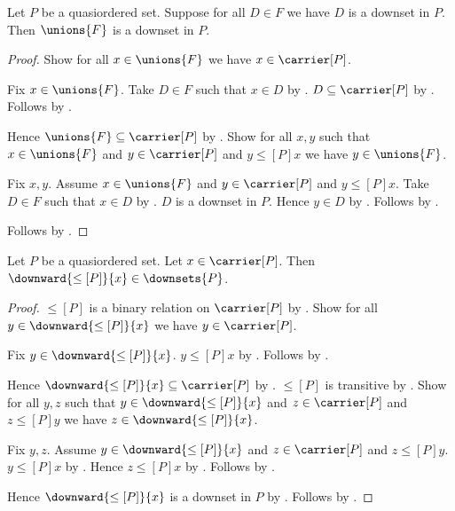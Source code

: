 \begin{proposition}\label{downset_unions}
    Let $P$ be a quasiordered set.
    Suppose for all $D\in F$ we have $D$ is a downset in $P$.
    Then $\unions{F}$ is a downset in $P$.
\end{proposition}
\begin{proof}
    Show for all $x\in\unions{F}$ we have $x\in\carrier[P]$.
    \begin{subproof}
        Fix $x\in\unions{F}$.
        Take $D\in F$ such that $x\in D$ by .
        $D\subseteq\carrier[P]$ by .
        Follows by .
    \end{subproof}
    Hence $\unions{F}\subseteq\carrier[P]$ by .
    Show for all $x,y$ such that $x\in\unions{F}$ and
        $y\in\carrier[P]$ and $y\mathrel{\leq[P]}x$ we have
        $y\in\unions{F}$.
    \begin{subproof}
        Fix $x,y$.
        Assume $x\in\unions{F}$ and $y\in\carrier[P]$ and
            $y\mathrel{\leq[P]}x$.
        Take $D\in F$ such that $x\in D$ by .
        $D$ is a downset in $P$.
        Hence $y\in D$ by .
        Follows by .
    \end{subproof}
    Follows by .
\end{proof}

\begin{theorem}\label{relation_downward_is_downset}
    Let $P$ be a quasiordered set.
    Let $x\in\carrier[P]$.
    Then $\downward{\leq[P]}{x}\in\downsets{P}$.
\end{theorem}
\begin{proof}
    $\leq[P]$ is a binary relation on $\carrier[P]$ by
        .
    Show for all $y\in\downward{\leq[P]}{x}$ we have
        $y\in\carrier[P]$.
    \begin{subproof}
        Fix $y\in\downward{\leq[P]}{x}$.
        $y\mathrel{\leq[P]}x$ by .
        Follows by .
    \end{subproof}
    Hence $\downward{\leq[P]}{x}\subseteq\carrier[P]$ by
        .
    $\leq[P]$ is transitive by .
    Show for all $y,z$ such that
        $y\in\downward{\leq[P]}{x}$ and $z\in\carrier[P]$ and
        $z\mathrel{\leq[P]}y$ we have
        $z\in\downward{\leq[P]}{x}$.
    \begin{subproof}
        Fix $y,z$.
        Assume $y\in\downward{\leq[P]}{x}$ and
            $z\in\carrier[P]$ and $z\mathrel{\leq[P]}y$.
        $y\mathrel{\leq[P]}x$ by .
        Hence $z\mathrel{\leq[P]}x$ by .
        Follows by .
    \end{subproof}
    Hence $\downward{\leq[P]}{x}$ is a downset in $P$ by
        .
    Follows by .
\end{proof}
